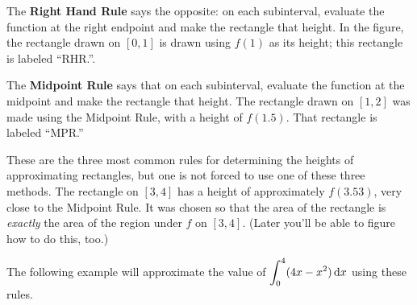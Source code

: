 The \textbf{Right Hand Rule} says the opposite: on each subinterval, evaluate the function at the right endpoint and make the rectangle that height. In the figure, the rectangle drawn on $[0,1]$ is drawn using $f(1)$ as its height; this rectangle is labeled ``RHR.''.

The \textbf{Midpoint Rule} says that on each subinterval, evaluate the function at the midpoint and make the rectangle that height. The rectangle drawn on $[1,2]$ was made using the Midpoint Rule, with a height of $f(1.5)$. That rectangle is labeled ``MPR.''

These are the three most common rules for determining the heights of approximating rectangles, but one is not forced to use one of these three methods. The rectangle on $[3,4]$ has a height of approximately $f(3.53)$, very close to the Midpoint Rule. It was chosen so that the area of the rectangle is \emph{exactly} the area of the region under $f$ on $[3,4]$. (Later you'll be able to figure how to do this, too.)

The following example will approximate the value of $\displaystyle\int_0^4 (4x-x^2)\operatorname{d}\! x$ using these rules.

